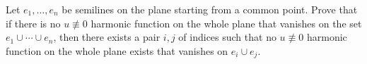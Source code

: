 Let $e_1,\ldots, e_n$ be semilines on the plane starting from a common point. Prove that if there is no $u\not\equiv 0$ harmonic function on the whole plane that vanishes on the set $e_1\cup \cdots \cup e_n$, then there exists a pair $i,j$ of indices such that no $u\not\equiv 0$ harmonic function on the whole plane exists that vanishes on $e_i\cup e_j$.